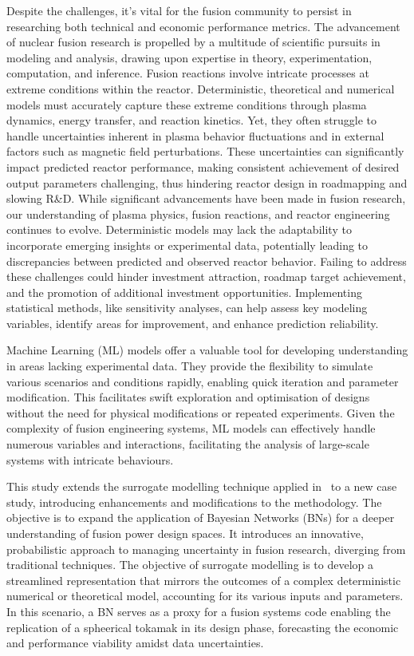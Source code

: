 \documentclass[journal]{IEEEtran}
\begin{document}
Despite the challenges, it's vital for the fusion community to persist in researching both technical and economic performance metrics. The advancement of nuclear fusion research is propelled by a multitude of scientific pursuits in modeling and analysis, drawing upon expertise in theory, experimentation, computation, and inference. Fusion reactions involve intricate processes at extreme conditions within the reactor. Deterministic, theoretical and numerical models must accurately capture these extreme conditions through plasma dynamics, energy transfer, and reaction kinetics. Yet, they often struggle to handle uncertainties inherent in plasma behavior fluctuations and in external factors such as magnetic field perturbations. These uncertainties can significantly impact predicted reactor performance, making consistent achievement of desired output parameters challenging, thus hindering reactor design in roadmapping and slowing R\&D. While significant advancements have been made in fusion research, our understanding of plasma physics, fusion reactions, and reactor engineering continues to evolve. Deterministic models may lack the adaptability to incorporate emerging insights or experimental data, potentially leading to discrepancies between predicted and observed reactor behavior. Failing to address these challenges could hinder investment attraction, roadmap target achievement, and the promotion of additional investment opportunities. Implementing statistical methods, like sensitivity analyses, can help assess key modeling variables, identify areas for improvement, and enhance prediction reliability.

Machine Learning (ML) models offer a valuable tool for developing understanding in areas lacking experimental data. They provide the flexibility to simulate various scenarios and conditions rapidly, enabling quick iteration and parameter modification. This facilitates swift exploration and optimisation of designs without the need for physical modifications or repeated experiments. Given the complexity of fusion engineering systems, ML models can effectively handle numerous variables and interactions, facilitating the analysis of large-scale systems with intricate behaviours.

This study extends the surrogate modelling technique applied in~\cite{Griffiths2024} to a new case study, introducing enhancements and modifications to the methodology. The objective is to expand the application of Bayesian Networks (BNs) for a deeper understanding of fusion power design spaces. It introduces an innovative, probabilistic approach to managing uncertainty in fusion research, diverging from traditional techniques. The objective of surrogate modelling is to develop a streamlined representation that mirrors the outcomes of a complex deterministic numerical or theoretical model, accounting for its various inputs and parameters. In this scenario, a BN serves as a proxy for a fusion systems code enabling the replication of a spheerical tokamak in its design phase, forecasting the economic and performance viability amidst data uncertainties.
\end{document}
